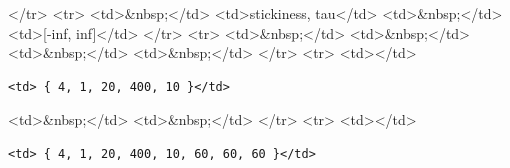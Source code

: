 \textless{}/tr\textgreater{} \textless{}tr\textgreater{} \textless{}td\textgreater{}\&nbsp;\textless{}/td\textgreater{} \textless{}td\textgreater{}stickiness, tau\textless{}/td\textgreater{} \textless{}td\textgreater{}\&nbsp;\textless{}/td\textgreater{} \textless{}td\textgreater{}[-inf, inf]\textless{}/td\textgreater{} \textless{}/tr\textgreater{} \textless{}tr\textgreater{} \textless{}td\textgreater{}\&nbsp;\textless{}/td\textgreater{} \textless{}td\textgreater{}\&nbsp;\textless{}/td\textgreater{} \textless{}td\textgreater{}\&nbsp;\textless{}/td\textgreater{} \textless{}td\textgreater{}\&nbsp;\textless{}/td\textgreater{} \textless{}/tr\textgreater{} \textless{}tr\textgreater{} \textless{}td\textgreater{}\textless{}/td\textgreater{}

\begin{verbatim}
<td> { 4, 1, 20, 400, 10 }</td>
\end{verbatim}

\textless{}td\textgreater{}\&nbsp;\textless{}/td\textgreater{} \textless{}td\textgreater{}\&nbsp;\textless{}/td\textgreater{} \textless{}/tr\textgreater{} \textless{}tr\textgreater{} \textless{}td\textgreater{}\textless{}/td\textgreater{}

\begin{verbatim}
<td> { 4, 1, 20, 400, 10, 60, 60, 60 }</td>
\end{verbatim}

